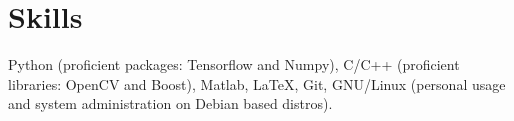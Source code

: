 \section{\mysidestyle \textcolor{olgray}{Skills}}
Python (proficient packages: Tensorflow and Numpy), C/C++ (proficient libraries: OpenCV and Boost), Matlab, \LaTeX, Git, GNU/Linux (personal usage and system administration on Debian based distros).
